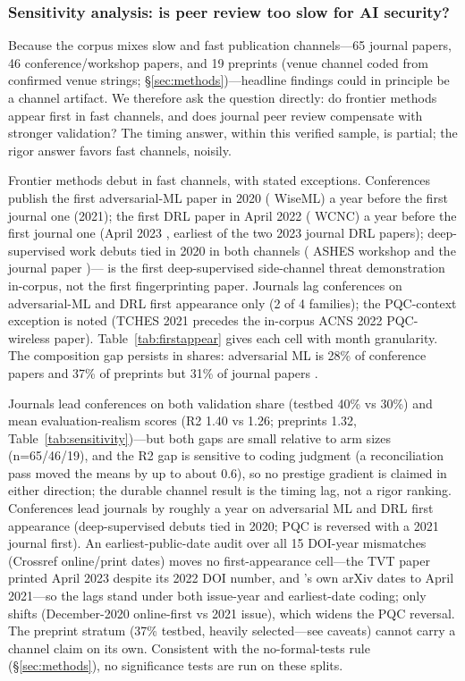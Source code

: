 \documentclass[10.5pt,compsoc,winfonts]{ICN}
\newcommand{\upcite}[1]{\cite{#1}}
\begin{document}
\subsubsection{Sensitivity analysis: is peer review too slow for AI security?}
\label{sec:sensitivity}
Because the corpus mixes slow and fast publication channels—65 journal papers, 46 conference/workshop papers, and 19 preprints (venue channel coded from confirmed venue strings; \S\ref{sec:methods})—headline findings could in principle be a channel artifact. We therefore ask the question directly: do frontier methods appear first in fast channels, and does journal peer review compensate with stronger validation? The timing answer, within this verified sample, is partial; the rigor answer favors fast channels, noisily.

Frontier methods debut in fast channels, with stated exceptions. Conferences publish the first adversarial-ML paper in 2020 (\upcite{T39} WiseML) a year before the first journal one (2021); the first DRL paper in April 2022 (\upcite{D34} WCNC) a year before the first journal one (April 2023 \upcite{D22}, earliest of the two 2023 journal DRL papers); deep-supervised work debuts tied in 2020 in both channels (\upcite{T01} ASHES workshop and the journal paper \upcite{D81})—\upcite{T01} is the first deep-supervised side-channel threat demonstration in-corpus, not the first fingerprinting paper. Journals lag conferences on adversarial-ML and DRL first appearance only (2 of 4 families); the PQC-context exception is noted (TCHES 2021 \upcite{P05} precedes the in-corpus ACNS 2022 PQC-wireless paper). Table~\ref{tab:firstappear} gives each cell with month granularity. The composition gap persists in shares: adversarial ML is 28\% of conference papers and 37\% of preprints but 31\% of journal papers .

Journals lead conferences on both validation share (testbed 40\% vs 30\%) and mean evaluation-realism scores (R2 1.40 vs 1.26; preprints 1.32, Table~\ref{tab:sensitivity})—but both gaps are small relative to arm sizes (n=65/46/19), and the R2 gap is sensitive to coding judgment (a reconciliation pass moved the means by up to about 0.6), so no prestige gradient is claimed in either direction; the durable channel result is the timing lag, not a rigor ranking. Conferences lead journals by roughly a year on adversarial ML and DRL first appearance (deep-supervised debuts tied in 2020; PQC is reversed with a 2021 journal first). An earliest-public-date audit over all 15 DOI-year mismatches (Crossref online/print dates) moves no first-appearance cell—the \upcite{D22} TVT paper printed April 2023 despite its 2022 DOI number, and \upcite{D36}'s own arXiv dates to April 2021—so the lags stand under both issue-year and earliest-date coding; only \upcite{P05} shifts (December-2020 online-first vs 2021 issue), which widens the PQC reversal. The preprint stratum (37\% testbed, heavily selected—see caveats) cannot carry a channel claim on its own. Consistent with the no-formal-tests rule (\S\ref{sec:methods}), no significance tests are run on these splits.
\end{document}
